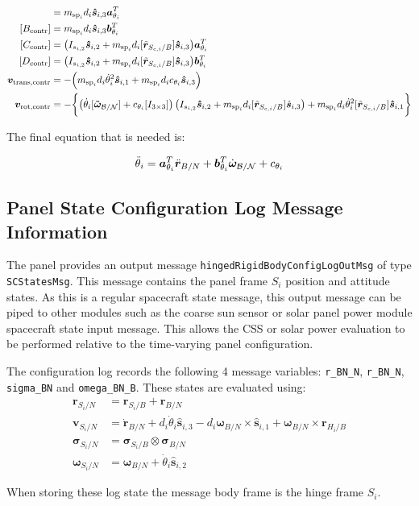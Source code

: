 \begin{align}
[A_{\textnormal{contr}}] &= m_{\text{sp}_i}d_i \bm{\hat{s}}_{i,3} \bm a_{\theta_i}^T
\\
[B_{\textnormal{contr}}] &= m_{\text{sp}_i}d_i \bm{\hat{s}}_{i,3} \bm b_{\theta_i}^T 
\\
[C_{\textnormal{contr}}] &= \big( I_{s_{i,2}}\bm{\hat{s}}_{i,2}+m_{\text{sp}_i}d_i [\tilde{\bm{r}}_{S_{c,i}/B}] \bm{\hat{s}}_{i,3}\big)\bm a_{\theta_i}^T
\\
[D_{\textnormal{contr}}] &= \big( I_{s_{i,2}}\bm{\hat{s}}_{i,2}+m_{\text{sp}_i}d_i [\tilde{\bm{r}}_{S_{c,i}/B}] \bm{\hat{s}}_{i,3}\big) \bm b_{\theta_i}^T
\\
\bm v_{\text{trans,contr}} &= -\Big(m_{\text{sp}_i}d_i \dot{\theta}_i^2 \bm{\hat{s}}_{i,1}+m_{\text{sp}_i}d_i c_{\theta_i} \bm{\hat{s}}_{i,3} \Big)
\\
\bm v_{\text{rot,contr}} &= -\biggl\lbrace\big(\dot{\theta}_i [\bm{\tilde{\omega}}_{\cal B/N}] +c_{\theta_i} [I_{3\times3}]\big) \left(I_{s_{i,2}} \bm{\hat{s}}_{i,2}+m_{\text{sp}_i} d_i [\tilde{\bm{r}}_{S_{c,i}/B}] \hat{\bm s}_{i,3}\right) +m_{\text{sp}_i}d_i\dot{\theta}_i^2[\tilde{\bm{r}}_{S_{c,i}/B}] \bm{\hat{s}}_{i,1} \biggr\rbrace 
\end{align}

The final equation that is needed is:

\begin{equation}
\ddot \theta_i = \bm a_{\theta_i}^T \ddot{\bm r}_{B/N} + \bm b_{\theta_i}^T \dot{\bm\omega}_{\cal B/N} + c_{\theta_i}
\label{eq:solar_panel_final5}
\end{equation}



\subsection{Panel State Configuration Log Message Information}
The panel provides an output message {\tt hingedRigidBodyConfigLogOutMsg} of type {\tt SCStatesMsg}.  This message contains the panel frame $S_i$ position and attitude states.  As this is a regular spacecraft state message, this output message can be piped to other modules such as the coarse sun sensor or solar panel power module spacecraft state input message.  This allows the CSS or solar power evaluation to be performed relative to the time-varying panel configuration.

The configuration log records the following 4 message variables: {\tt r\_BN\_N}, {\tt r\_BN\_N}, {\tt sigma\_BN} and {\tt omega\_BN\_B}.  These states are evaluated using:
\begin{align}
	\bm r_{S_i/N} &= \bm r_{S_i/B} + \bm r_{B/N}
	\\
	\bm v_{S_i/N} &= \dot{\bm r}_{B/N} + d_i \dot\theta_i \hat{\bm s}_{i,3} - d_i \bm\omega_{B/N}\times \hat{\bm s}_{i,1} + \bm\omega_{B/N} \times \bm r_{H_i/B}
	\\
	\bm\sigma_{S_i/N} &=  \bm\sigma_{S_i/B} \otimes\bm\sigma_{B/N}
	\\
	\bm\omega_{S_i/N} &= \bm\omega_{B/N} + \dot\theta_i \hat{\bm s}_{i,2}
\end{align}

When storing these log state the message body frame is the hinge frame $S_i$.
